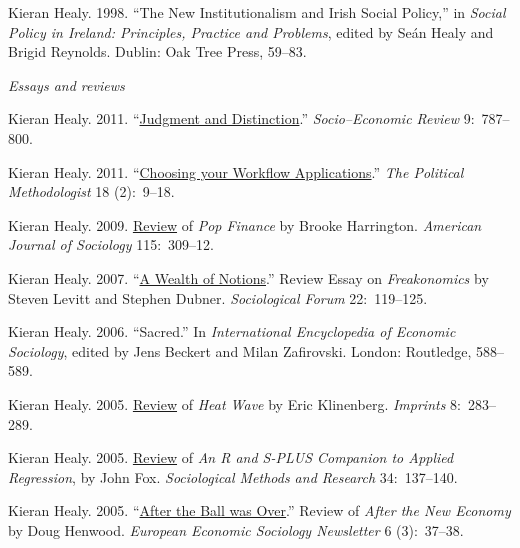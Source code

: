 \documentclass[11pt,article,oneside]{memoir}
\begin{document}
 \ind  Kieran Healy. 1998. ``The New Institutionalism and Irish Social Policy,'' in
\emph{Social Policy in Ireland: Principles, Practice and Problems}, edited by
Se\'{a}n Healy and Brigid Reynolds. Dublin: Oak Tree Press, 59--83.



\bigskip 

\noindent\emph{Essays and reviews \vspace{0.05in}}


\ind Kieran Healy. 2011. ``\href{http://www.kieranhealy.org/files/reviews/karpik-review.pdf}{Judgment and Distinction}.'' \emph{Socio--Economic Review} 9:~787--800. 

\ind Kieran Healy. 2011. ``\href{http://polmeth.wustl.edu/methodologist/tpm_v18_n2.pdf}{Choosing your Workflow Applications}.'' \emph{The Political Methodologist} 18 (2):~9--18. 

\ind Kieran Healy. 2009. \href{http://www.journals.uchicago.edu/doi/pdf/10.1086/605757}{Review} of \emph{Pop Finance} by Brooke Harrington. \emph{American Journal of Sociology} 115:~309--12.

\ind Kieran Healy. 2007. ``\href{http://www.kieranhealy.org/files/reviews/socforum-article.pdf}{A Wealth of Notions}.'' Review
Essay on \emph{Freakonomics} by Steven Levitt and Stephen Dubner. \emph{Sociological Forum} 22:~119--125. 

\ind  Kieran Healy. 2006. ``Sacred.'' In \emph{International Encyclopedia of Economic Sociology}, edited by Jens Beckert and Milan Zafirovski. London: Routledge, 588--589. 

\ind  Kieran Healy. 2005. \href{http://www.kieranhealy.org/files/reviews/klinenberg.pdf}{Review} of \emph{Heat Wave} by Eric Klinenberg. \emph{Imprints} 8:~283--289.

\ind  Kieran Healy. 2005. \href{http://www.kieranhealy.org/files/reviews/fox.pdf}{Review} of \emph{An R and S-PLUS Companion to Applied Regression}, by John Fox. \emph{Sociological Methods and Research} 34:~137--140.

\ind  Kieran Healy. 2005. ``\href{http://www.kieranhealy.org/files/reviews/henwood.pdf}{After the Ball was Over}.'' Review of \emph{After the New
  Economy} by Doug Henwood. \emph{European Economic Sociology Newsletter} 6 (3):~37--38.
\end{document}
